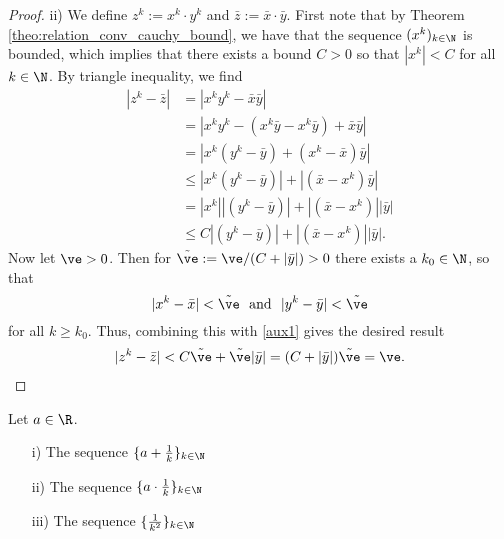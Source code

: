 {\begin{frame}
{\begin{proof}
		ii) We define $z^k := x^k \cdot y^k$ and $\bar{z} := \bar{x} \cdot \bar{y}$. First note that by Theorem \ref{theo:relation_conv_cauchy_bound}, we have that the sequence $(x^k)_{k\in \N}$ is bounded, which implies that there exists a bound $C>0$ so that $|x^k| < C$ for all $k\in\N$. By triangle inequality, we find
	\begin{equation} \label{aux1}
	\begin{aligned}
	|z^k - \bar{z}| &= |x^ky^k -  \bar{x}\bar{y}| \\
	&= |x^ky^k - (x^k\bar{y}-x^k\bar{y}) + \bar{x}\bar{y}| \\ 
	&= |x^k(y^k-\bar{y}) +  (x^k-\bar{x})\bar{y}| \\ 
	&\leq  |x^k(y^k-\bar{y})| +  |( \bar{x}-x^k)\bar{y}| \\
	&=  |x^k ||(y^k-\bar{y})| +  |( \bar{x}-x^k)||\bar{y}| \\
	&\leq C |(y^k-\bar{y})| + |( \bar{x}-x^k)||\bar{y}|.
	\end{aligned}
	\end{equation}
	Now let $\ve > 0$. Then for $\tilde{\ve} := \ve / (C+|\bar{y}|) > 0$ there exists a $k_0 \in \N$, so that 
	$$|x^k-\bar{x}| <  \tilde{\ve} ~~\text{and}~~|y^k-\bar{y}| <  \tilde{\ve}$$
	for all $k \geq k_0$. Thus, combining this with \eqref{aux1} 
	gives the desired result
	\begin{align*}
	|z^k - \bar{z}|  < C \tilde{\ve}  + \tilde{\ve} |\bar{y}| = (C+|\bar{y}|)\tilde{\ve}  = \ve.
	\end{align*}
\end{proof}}

\begin{ex}
	\blank Let $a \in \R$.
	\begin{itemize}
		\item[i)] The sequence $\{a + \frac{1}{k}\}_{k\in\N}$
		\item[ii)] The sequence $\{a \cdot\frac{1}{k}\}_{k\in\N}$
		\item[iii)] The sequence $\{ \frac{1}{k^2}\}_{k\in\N}$
	\end{itemize}
\end{ex}
 \end{frame}



}
